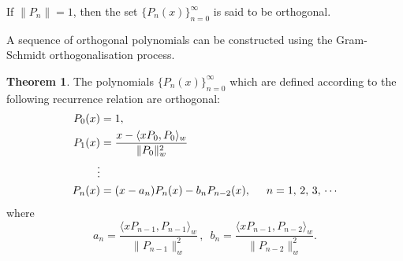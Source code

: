 \documentclass[12pt,a4paper]{report}
\theoremstyle{definition}
\newtheorem{thm}{Theorem}[section]
\theoremstyle{plain}
\begin{document}
If $\lVert P_n\rVert = 1$, then the set $\{P_n(x)\}^{\infty}_{n = 0}$ is said to be orthogonal.


A sequence of orthogonal polynomials can be constructed using the Gram-Schmidt orthogonalisation process.



\begin{thm}
The polynomials $\{P_n(x)\}^{\infty}_{n=0}$ which are defined according to the following recurrence relation are orthogonal:
\begin{align*}
P_0(x) & = 1,\\
P_1(x) & = \frac{x - \langle x P_0, P_0\rangle_w}{\lVert P_0\rVert_w^2}\\
\vdots & \\
P_n(x) & = (x-a_n)P_n(x) - b_nP_{n-2}(x), \hspace{0.5cm} n = 1, \, 2, \, 3,\, \cdots
\end{align*}
where
$$a_n = \frac{\langle x P_{n-1}, P_{n-1}\rangle_w}{\lVert P_{n-1}\rVert^2_w}\, , \, \, \, b_n = \frac{\langle x P_{n-1}, P_{n-2}\rangle_w}{\lVert P_{n-2}\rVert^2_w}.$$
\end{thm}
\end{document}
